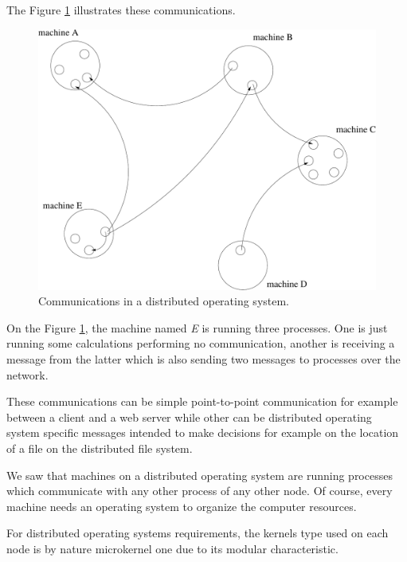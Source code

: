 The Figure \ref{figure:overview_distributed-operating-system} illustrates
these communications.

\begin{figure}[h]
  \begin{center}
    \includegraphics[scale=0.5]{figures/overview_distributed-operating-system.pdf}
    \caption{Communications in a distributed operating system.}
    \label{figure:overview_distributed-operating-system}
  \end{center}
\end{figure}

On the Figure \ref{figure:overview_distributed-operating-system}, the machine
named \textit{E} is running three processes. One is just running some
calculations performing no communication, another is receiving a message
from the latter which is also sending two messages to processes over the
network.

These communications can be simple point-to-point communication for example
between a client and a web server while other can be distributed operating
system specific messages intended to make decisions for example on the
location of a file on the distributed file system.

We saw that machines on a distributed operating system are running processes
which communicate with any other process of any other node. Of course,
every machine needs an operating system to organize the computer resources.

For distributed operating systems requirements, the kernels type used on
each node is by nature microkernel one due to its modular characteristic.

